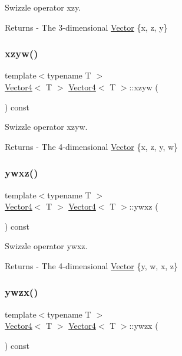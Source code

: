 Swizzle operator xzy. \begin{DoxyReturn}{Returns}
-\/ The 3-\/dimensional \mbox{\hyperlink{class_vector}{Vector}} \{x, z, y\} 
\end{DoxyReturn}
\mbox{\label{class_vector4_a706593d979b9a4265eeb4c9659dcfa27}} 
\subsubsection{\texorpdfstring{xzyw()}{xzyw()}}
{\footnotesize\ttfamily template$<$typename T $>$ \\
\mbox{\hyperlink{class_vector4}{Vector4}}$<$ T $>$ \mbox{\hyperlink{class_vector4}{Vector4}}$<$ T $>$\+::xzyw (\begin{DoxyParamCaption}{ }\end{DoxyParamCaption}) const}

Swizzle operator xzyw. \begin{DoxyReturn}{Returns}
-\/ The 4-\/dimensional \mbox{\hyperlink{class_vector}{Vector}} \{x, z, y, w\} 
\end{DoxyReturn}
\mbox{\label{class_vector4_a2025a5efe716031e2c6014f3f01ef05c}} 
\subsubsection{\texorpdfstring{ywxz()}{ywxz()}}
{\footnotesize\ttfamily template$<$typename T $>$ \\
\mbox{\hyperlink{class_vector4}{Vector4}}$<$ T $>$ \mbox{\hyperlink{class_vector4}{Vector4}}$<$ T $>$\+::ywxz (\begin{DoxyParamCaption}{ }\end{DoxyParamCaption}) const}

Swizzle operator ywxz. \begin{DoxyReturn}{Returns}
-\/ The 4-\/dimensional \mbox{\hyperlink{class_vector}{Vector}} \{y, w, x, z\} 
\end{DoxyReturn}
\mbox{\label{class_vector4_a3b09382c6fad1d44e20852d3948d070f}} 
\subsubsection{\texorpdfstring{ywzx()}{ywzx()}}
{\footnotesize\ttfamily template$<$typename T $>$ \\
\mbox{\hyperlink{class_vector4}{Vector4}}$<$ T $>$ \mbox{\hyperlink{class_vector4}{Vector4}}$<$ T $>$\+::ywzx (\begin{DoxyParamCaption}{ }\end{DoxyParamCaption}) const}

